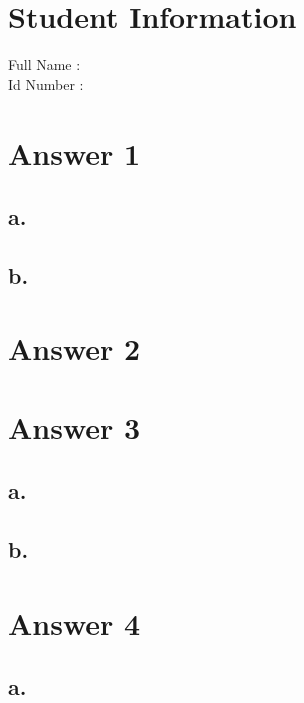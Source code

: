 \documentclass[12pt]{article}
\begin{document}
\section*{Student Information } 
Full Name :  \\
Id Number :  \\

\section*{Answer 1}

\subsection*{a.}

\subsection*{b.}



\section*{Answer 2}




\section*{Answer 3}


\subsection*{a.}

\subsection*{b.}




\section*{Answer 4}

\subsection*{a.}
\end{document}
